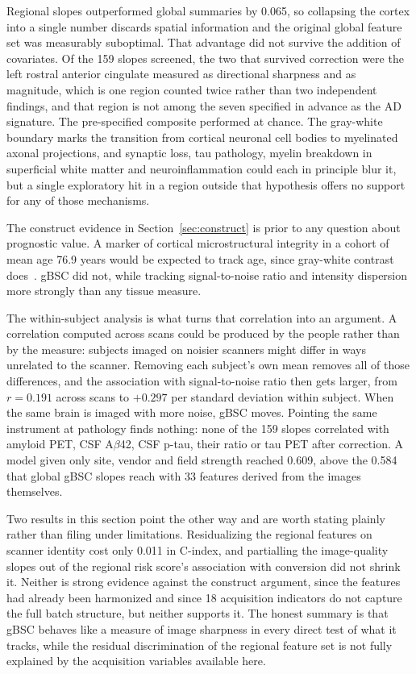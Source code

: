 \documentclass[blue]{ludusofficial}  %
\begin{document}
Regional slopes outperformed global summaries by 0.065, so collapsing the cortex into a single number discards spatial information and the original global feature set was measurably suboptimal. That advantage did not survive the addition of covariates. Of the 159 slopes screened, the two that survived correction were the left rostral anterior cingulate measured as directional sharpness and as magnitude, which is one region counted twice rather than two independent findings, and that region is not among the seven specified in advance as the AD signature. The pre-specified composite performed at chance. The gray-white boundary marks the transition from cortical neuronal cell bodies to myelinated axonal projections, and synaptic loss, tau pathology, myelin breakdown in superficial white matter and neuroinflammation could each in principle blur it, but a single exploratory hit in a region outside that hypothesis offers no support for any of those mechanisms.

The construct evidence in Section~\ref{sec:construct} is prior to any question about prognostic value. A marker of cortical microstructural integrity in a cohort of mean age 76.9 years would be expected to track age, since gray-white contrast does~\cite{salat2009age}. gBSC did not, while tracking signal-to-noise ratio and intensity dispersion more strongly than any tissue measure.

The within-subject analysis is what turns that correlation into an argument. A correlation computed across scans could be produced by the people rather than by the measure: subjects imaged on noisier scanners might differ in ways unrelated to the scanner. Removing each subject's own mean removes all of those differences, and the association with signal-to-noise ratio then gets larger, from $r = 0.191$ across scans to $+0.297$ per standard deviation within subject. When the same brain is imaged with more noise, gBSC moves. Pointing the same instrument at pathology finds nothing: none of the 159 slopes correlated with amyloid PET, CSF A$\beta$42, CSF p-tau, their ratio or tau PET after correction. A model given only site, vendor and field strength reached 0.609, above the 0.584 that global gBSC slopes reach with 33 features derived from the images themselves.

Two results in this section point the other way and are worth stating plainly rather than filing under limitations. Residualizing the regional features on scanner identity cost only 0.011 in C-index, and partialling the image-quality slopes out of the regional risk score's association with conversion did not shrink it. Neither is strong evidence against the construct argument, since the features had already been harmonized and since 18 acquisition indicators do not capture the full batch structure, but neither supports it. The honest summary is that gBSC behaves like a measure of image sharpness in every direct test of what it tracks, while the residual discrimination of the regional feature set is not fully explained by the acquisition variables available here.
\end{document}
